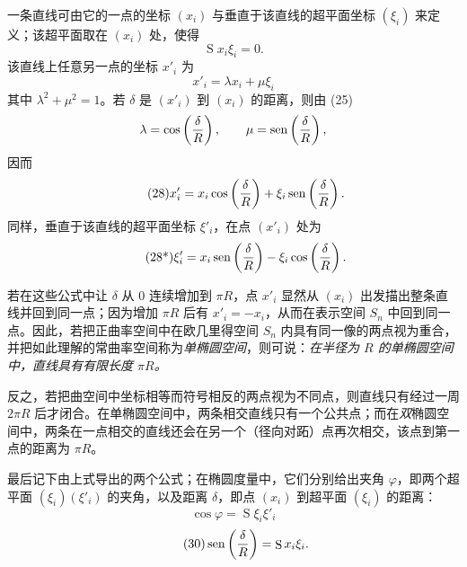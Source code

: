 一条直线可由它的一点的坐标 $(x_i)$ 与垂直于该直线的超平面坐标 $(\xi_i)$ 来定义；该超平面取在 $(x_i)$ 处，使得
\[
 \mathop{\mathrm{S}}x_i\xi_i=0.
\]
该直线上任意另一点的坐标 $x'_i$ 为
\[
 x'_i=\lambda x_i+\mu\xi_i
\]
其中 $\lambda^2+\mu^2=1$。若 $\delta$ 是 $(x'_i)$ 到 $(x_i)$ 的距离，则由 (25)
\[
 \lambda=\cos\left(\frac\delta R\right),\qquad \mu=\operatorname{sen}\left(\frac\delta R\right),
\]
因而
\[
\tag{28}
 x'_i=x_i\cos\left(\frac\delta R\right)+\xi_i\operatorname{sen}\left(\frac\delta R\right).
\]
同样，垂直于该直线的超平面坐标 $\xi'_i$，在点 $(x'_i)$ 处为
\[
\tag{28*}
 \xi'_i=x_i\operatorname{sen}\left(\frac\delta R\right)-\xi_i\cos\left(\frac\delta R\right).
\]

若在这些公式中让 $\delta$ 从 $0$ 连续增加到 $\pi R$，点 $x'_i$ 显然从 $(x_i)$ 出发描出整条直线并回到同一点；因为增加 $\pi R$ 后有 $x'_i=-x_i$，从而在表示空间 $S_n$ 中回到同一点。因此，若把正曲率空间中在欧几里得空间 $S_n$ 内具有同一像的两点视为重合，并把如此理解的常曲率空间称为\emph{单椭圆空间}，则可说：\emph{在半径为 $R$ 的单椭圆空间中，直线具有有限长度 $\pi R$。}

反之，若把曲空间中坐标相等而符号相反的两点视为不同点，则直线只有经过一周 $2\pi R$ 后才闭合。在单椭圆空间中，两条相交直线只有一个公共点；而在\emph{双}椭圆空间中，两条在一点相交的直线还会在另一个（径向对跖）点再次相交，该点到第一点的距离为 $\pi R$。

最后记下由上式导出的两个公式；在椭圆度量中，它们分别给出夹角 $\varphi$，即两个超平面 $(\xi_i)(\xi'_i)$ 的夹角，以及距离 $\delta$，即点 $(x_i)$ 到超平面 $(\xi_i)$ 的距离：
\[
\tag{29}
 \cos\varphi=\mathop{\mathrm{S}}\xi_i\xi'_i
\]
\[
\tag{30}
 \operatorname{sen}\left(\frac\delta R\right)=\mathop{\mathrm{S}}x_i\xi_i.
\]
